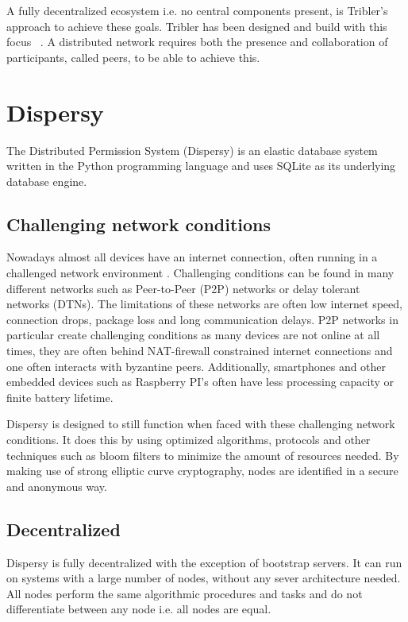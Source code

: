 A fully decentralized ecosystem i.e. no central components present, is Tribler's approach to achieve these goals.
Tribler has been designed and build with this focus~\cite{Pouwelse-tribler,Bakker-tribler} .
A distributed network requires both the presence and collaboration of participants, called peers, to be able to achieve this.

\section{Dispersy}
The Distributed Permission System (Dispersy) is an elastic database system written in the Python programming language and uses SQLite as its underlying database engine.

\subsection{Challenging network conditions}
Nowadays almost all devices have an internet connection, often running in a challenged network environment \cite{dispersy2016dispersy}.
Challenging conditions can be found in many different networks such as Peer-to-Peer (P2P) networks or delay tolerant networks (DTNs).
The limitations of these networks are often low internet speed, connection drops, package loss and long communication delays.
P2P networks in particular create challenging conditions as many devices are not online at all times, they are often behind NAT-firewall constrained internet connections and one often interacts with byzantine peers.
Additionally, smartphones and other embedded devices such as Raspberry PI's often have less processing capacity or finite battery lifetime.

Dispersy is designed to still function when faced with these challenging network conditions.
It does this by using optimized algorithms, protocols and other techniques such as bloom filters to minimize the amount of resources needed.
By making use of strong elliptic curve cryptography, nodes are identified in a secure and anonymous way.

\subsection{Decentralized}
Dispersy is fully decentralized with the exception of bootstrap servers.
It can run on systems with a large number of nodes, without any sever architecture needed.
All nodes perform the same algorithmic procedures and tasks and do not differentiate between any node i.e. all nodes are equal.

